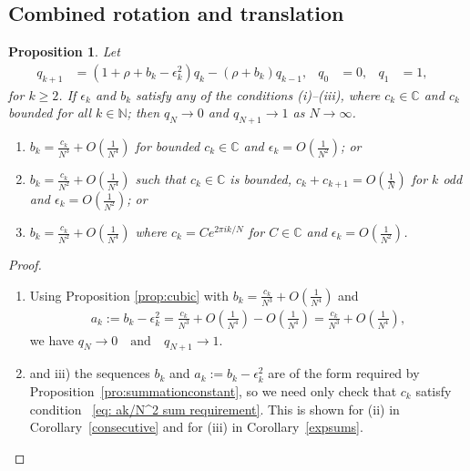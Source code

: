 \documentclass{amsart}
\newtheorem{prop}{Proposition}
\theoremstyle{remark}
\theoremstyle{definition}
\newcommand{\lp}{\left(}
\newcommand{\rp}{\right)}
\begin{document}
\subsection{Combined rotation and translation}

\begin{prop}\label{prop:qklimits}
	Let 
    \begin{align*}
		q_{k+1} &= (1+\rho+b_k-\epsilon_k^2) q_{k}-(\rho+b_k) q_{k-1}, & q_0 &=0, & q_1 &=1, &
	\end{align*}
    for $k\geq2$.
    If $\epsilon_k$ and $b_k$ satisfy any of the conditions (i)–(iii), where $c_{k}\in\mathbb{C}$ and $c_{k}$ bounded for all $k\in \mathbb{N}$;
then $q_N \to 0$ and $q_{N+1} \to 1$ as $N \to \infty$.
    	\begin{enumerate}
		\item[i)] $\displaystyle{b_k = \frac{c_k}{N^3}+O\lp\frac{1}{N^4}\rp}$ for bounded $c_k\in\mathbb{C}$ and $\displaystyle{\epsilon_k= O\lp\frac{1}{N^2}\rp}$; or
		\item[ii)]  $\displaystyle{b_k = \frac{c_k}{N^2}+O\lp\frac{1}{N^4}\rp}$ such that $c_k\in\mathbb{C}$ is bounded, $\displaystyle{c_k+c_{k+1}=O\lp\frac{1}{N}\rp}$ for $k$ odd and $\displaystyle{\epsilon_k= O\lp\frac{1}{N^2}\rp}$; or
        \item[iii)] $\displaystyle{b_k = \frac{c_{k}}{N^2}+O\lp\frac{1}{N^{4}}\rp}$ where $\displaystyle{c_{k} = Ce^{2\pi i k/N}}$ for $C\in\mathbb{C}$ and $\displaystyle{\epsilon_k= O\lp\frac{1}{N^2}\rp}$. 
	\end{enumerate}
\end{prop}	

\begin{proof}

\begin{enumerate}
		\item[i)] Using Proposition \ref{prop:cubic} with $b_k = \frac{c_k}{N^3}+O\lp\frac{1}{N^4}\rp$ and         
        \begin{align*}
            a_{k} := b_{k}- \epsilon_{k}^{2} =\frac{c_k}{N^3}+O\lp\frac{1}{N^4}\rp -  O\lp\frac{1}{N^4}\rp = \frac{c_k}{N^3}+O\lp\frac{1}{N^4}\rp,
        \end{align*}
we have $q_N\rightarrow 0 \quad\text{and}\quad q_{N+1}\rightarrow 1.$
    \item[ii)] and iii) the sequences $b_{k}$ and $a_{k}:=b_k-\epsilon_k^2$ are of the form required by Proposition~\ref{pro:summationconstant}, so we need only check that $c_{k}$ satisfy condition ~\eqref{eq: ak/N^2 sum requirement}. This is shown for (ii) in Corollary~\ref{consecutive} and for (iii) in Corollary~\ref{expsums}.

\end{enumerate}
\end{proof}
\end{document}
